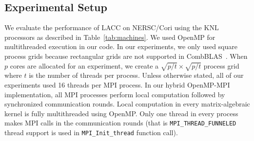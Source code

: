 \subsection{Experimental Setup} 
We evaluate the performance of LACC on NERSC/Cori using the KNL processors as described in Table~\ref{tab:machines}.
We used OpenMP for multithreaded execution in our code. 
In our experiments, we only used square process grids because rectangular grids are not supported in CombBLAS~\cite{bulucc2011combinatorial}. 
When $p$ cores are allocated for an experiment, we create a $\sqrt{p/t} \times \sqrt{p/t} $ process grid where $t$ is the number of threads per process.
Unless otherwise stated, all of our experiments used 16 threads per MPI process.
In our hybrid OpenMP-MPI implementation, all MPI processes perform local computation followed by synchronized communication rounds. 
Local computation in every matrix-algebraic kernel is fully multithreaded using OpenMP.
Only one thread in every process makes MPI calls in the communication rounds (that is \texttt{MPI\_THREAD\_FUNNELED} thread support is used in \texttt{MPI\_Init\_thread} function call).


